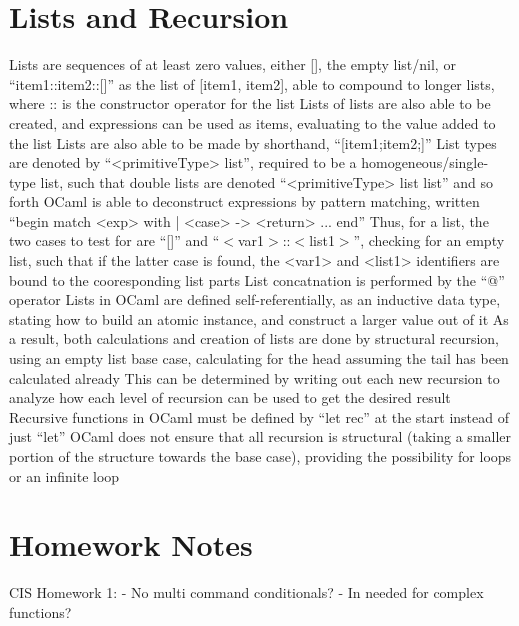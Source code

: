 \documentclass[11 pt, twoside]{article}
\newenvironment{outline*}
{
	\begin{outline}[enumerate]
	}
	{\end{outline}
}
\begin{document}
\section{Lists and Recursion}
\begin{outline*}
\1 Lists are sequences of at least zero values, either [], the empty list/nil, or ``item1::item2::[]'' as the list of [item1, item2], able to compound to longer lists, where :: is the constructor operator for the list
\2 Lists of lists are also able to be created, and expressions can be used as items, evaluating to the value added to the list
\2 Lists are also able to be made by shorthand, ``[item1;item2;]''
\2 List types are denoted by ``<primitiveType> list'', required to be a homogeneous/single-type list, such that double lists are denoted ``<primitiveType> list list'' and so forth
\2 OCaml is able to deconstruct expressions by pattern matching, written ``begin match <exp> with | <case> -> <return> ... end''
\3 Thus, for a list, the two cases to test for are ``[]'' and ``$<$var1$>$::$<$list1$>$'', checking for an empty list, such that if the latter case is found, the <var1> and <list1> identifiers are bound to the cooresponding list parts
\2 List concatnation is performed by the ``@'' operator
\1 Lists in OCaml are defined self-referentially, as an inductive data type, stating how to build an atomic instance, and construct a larger value out of it
\2 As a result, both calculations and creation of lists are done by structural recursion, using an empty list base case, calculating for the head assuming the tail has been calculated already
\3 This can be determined by writing out each new recursion to analyze how each level of recursion can be used to get the desired result
\2 Recursive functions in OCaml must be defined by ``let rec'' at the start instead of just ``let''
\2 OCaml does not ensure that all recursion is structural (taking a smaller portion of the structure towards the base case), providing the possibility for loops or an infinite loop
\end{outline*}
\section{Homework Notes}
CIS Homework 1:
- No multi command conditionals?
- In needed for complex functions?
\end{document}
